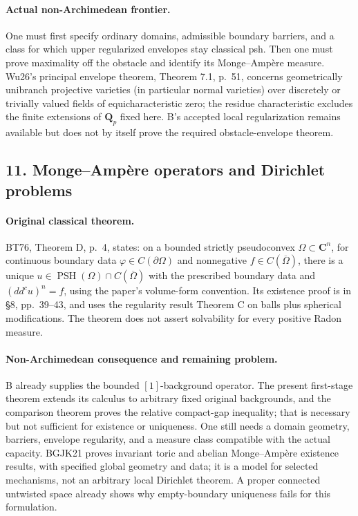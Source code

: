 \documentclass[11pt,a4paper]{article}
\numberwithin{equation}{section}
\theoremstyle{definition}
\theoremstyle{remark}
\begin{document}
\paragraph{Actual non-Archimedean frontier.}
One must first specify ordinary domains, admissible boundary barriers,
and a class for which upper regularized envelopes stay classical psh.
Then one must prove maximality off the obstacle and identify its
Monge--Amp\`ere measure. Wu26's principal envelope theorem,
Theorem 7.1, p.~51, concerns geometrically unibranch projective
varieties (in particular normal varieties) over discretely or trivially
valued fields of equicharacteristic zero; the residue
characteristic excludes the finite extensions of \(\mathbf Q_p\)
fixed here. B's accepted local regularization remains available but
does not by itself prove the required obstacle-envelope theorem.
\cite[Theorem 7.1]{Wu26}

\subsection{11. Monge--Amp\`ere operators and Dirichlet problems}

\paragraph{Original classical theorem.}
BT76, Theorem D, p.~4, states: on a bounded strictly pseudoconvex
\(\Omega\subset\mathbf C^n\), for continuous boundary data
\(\varphi\in C(\partial\Omega)\) and nonnegative
\(f\in C(\overline\Omega)\), there is a unique
\(u\in\operatorname{PSH}(\Omega)\cap C(\overline\Omega)\)
with the prescribed boundary data and \((dd^cu)^n=f\), using the
paper's volume-form convention. Its existence proof is in \S8,
pp.~39--43, and uses the regularity result Theorem C on balls plus
spherical modifications. The theorem does not assert solvability for
every positive Radon measure.\cite[Theorems C--D and \S8]{BT76}

\paragraph{Non-Archimedean consequence and remaining problem.}
B already supplies the bounded \([1]\)-background operator. The present
first-stage theorem extends its calculus to arbitrary fixed original
backgrounds, and the comparison theorem proves the relative compact-gap
inequality; that is necessary but not
sufficient for existence or uniqueness. One still needs a domain
geometry, barriers, envelope regularity, and a measure class compatible
with the actual capacity. BGJK21 proves invariant toric and abelian
Monge--Amp\`ere existence results, with specified global geometry and
data; it is a model for selected mechanisms, not an arbitrary local
Dirichlet theorem. A proper connected untwisted space already shows
why empty-boundary uniqueness fails for this formulation.
\cite[\S\S6--8]{BGJK21}
\end{document}
